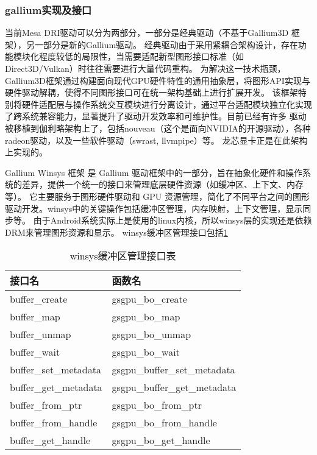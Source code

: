 \subsubsection{gallium实现及接口}
当前Mesa DRI驱动可以分为两部分，一部分是经典驱动（不基于Gallium3D 框架），另一部分是新的Gallium驱动。 
经典驱动由于采用紧耦合架构设计，存在功能模块化程度较低的局限性，当需要适配新型图形接口标准（如Direct3D/Vulkan）时往往需要进行大量代码重构。
为解决这一技术瓶颈，Gallium3D框架通过构建面向现代GPU硬件特性的通用抽象层，将图形API实现与硬件驱动解耦，使得不同图形接口可在统一架构基础上进行扩展开发。
该框架特别将硬件适配层与操作系统交互模块进行分离设计，通过平台适配模块独立化实现了跨系统兼容能力，显著提升了驱动开发效率和可维护性。目前已经有许多
驱动被移植到伽利略架构上了，包括nouveau（这个是面向NVIDIA的开源驱动），各种radeon驱动，以及一些软件驱动（swrast, llvmpipe）等。
龙芯显卡正是在此架构上实现的。

Gallium Winsys 框架 是 Gallium 驱动框架中的一部分，旨在抽象化硬件和操作系统的差异，提供一个统一的接口来管理底层硬件资源（如缓冲区、上下文、内存等）。
它主要服务于图形硬件驱动和 GPU 资源管理，简化了不同平台之间的图形驱动开发。winsys中的关键操作包括缓冲区管理，内存映射，上下文管理，显示同步等。
由于Android系统实际上是使用的linux内核，所以winsys层的实现还是依赖DRM来管理图形资源和显示。
winsys缓冲区管理接口包括\ref{tab:winsys缓冲区管理接口表}

\begin{table}[h]
  \centering
  \caption{winsys缓冲区管理接口表}
  \label{tab:winsys缓冲区管理接口表}
  \begin{tabular}{ll}
    \toprule
    接口名  & 函数名 \\
    \midrule
    buffer\_create & gsgpu\_bo\_create  \\
    buffer\_map & gsgpu\_bo\_map \\
    buffer\_unmap & gsgpu\_bo\_unmap \\
    buffer\_wait & gsgpu\_bo\_wait \\
    buffer\_set\_metadata & gsgpu\_buffer\_set\_metadata \\
    buffer\_get\_metadata & gsgpu\_buffer\_get\_metadata \\
    buffer\_from\_ptr & gsgpu\_bo\_from\_ptr \\
    buffer\_from\_handle & gsgpu\_bo\_from\_handle \\
    buffer\_get\_handle & gsgpu\_bo\_get\_handle \\
    \bottomrule
  \end{tabular}
  \note{}
\end{table}

